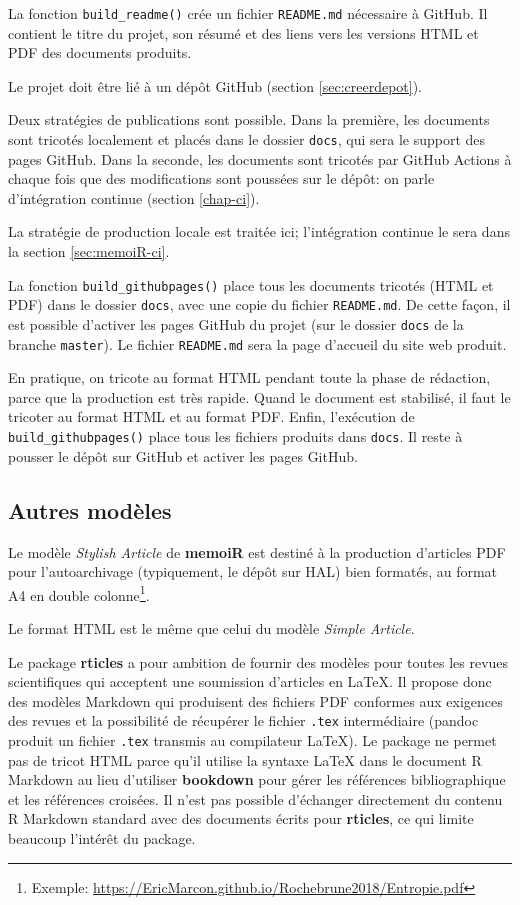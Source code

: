 \documentclass[
  12pt,
  french,
  a4paper,
  extrafontsizes,onecolumn,openright
  ]{memoir}
\begin{document}
La fonction \texttt{build\_readme()} crée un fichier \texttt{README.md} nécessaire à GitHub.
Il contient le titre du projet, son résumé et des liens vers les versions HTML et PDF des documents produits.

Le projet doit être lié à un dépôt GitHub (section \ref{sec:creerdepot}).

Deux stratégies de publications sont possible.
Dans la première, les documents sont tricotés localement et placés dans le dossier \texttt{docs}, qui sera le support des pages GitHub.
Dans la seconde, les documents sont tricotés par GitHub Actions à chaque fois que des modifications sont poussées sur le dépôt: on parle d'intégration continue (section \ref{chap-ci}).

La stratégie de production locale est traitée ici; l'intégration continue le sera dans la section \ref{sec:memoiR-ci}.

La fonction \texttt{build\_githubpages()} place tous les documents tricotés (HTML et PDF) dans le dossier \texttt{docs}, avec une copie du fichier \texttt{README.md}.
De cette façon, il est possible d'activer les pages GitHub du projet (sur le dossier \texttt{docs} de la branche \texttt{master}).
Le fichier \texttt{README.md} sera la page d'accueil du site web produit.

En pratique, on tricote au format HTML pendant toute la phase de rédaction, parce que la production est très rapide.
Quand le document est stabilisé, il faut le tricoter au format HTML et au format PDF.
Enfin, l'exécution de \texttt{build\_githubpages()} place tous les fichiers produits dans \texttt{docs}.
Il reste à pousser le dépôt sur GitHub et activer les pages GitHub.

\subsection{Autres modèles}\label{autres-moduxe8les}

Le modèle \emph{Stylish Article} de \textbf{memoiR} est destiné à la production d'articles PDF pour l'autoarchivage (typiquement, le dépôt sur HAL) bien formatés, au format A4 en double colonne\footnote{Exemple: \url{https://EricMarcon.github.io/Rochebrune2018/Entropie.pdf}}.

Le format HTML est le même que celui du modèle \emph{Simple Article}.

Le package \textbf{rticles} a pour ambition de fournir des modèles pour toutes les revues scientifiques qui acceptent une soumission d'articles en LaTeX.
Il propose donc des modèles Markdown qui produisent des fichiers PDF conformes aux exigences des revues et la possibilité de récupérer le fichier \texttt{.tex} intermédiaire (pandoc produit un fichier \texttt{.tex} transmis au compilateur LaTeX).
Le package ne permet pas de tricot HTML parce qu'il utilise la syntaxe LaTeX dans le document R Markdown au lieu d'utiliser \textbf{bookdown} pour gérer les références bibliographique et les références croisées.
Il n'est pas possible d'échanger directement du contenu R Markdown standard avec des documents écrits pour \textbf{rticles}, ce qui limite beaucoup l'intérêt du package.
\end{document}
